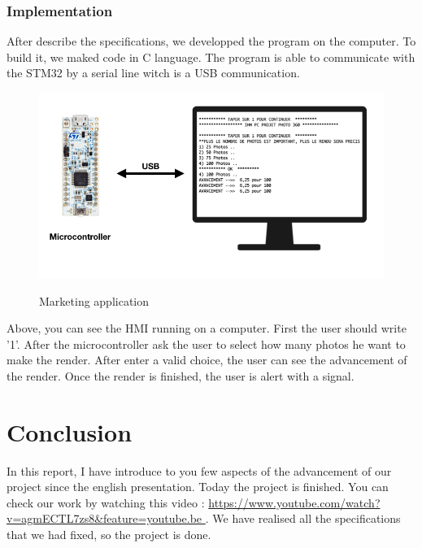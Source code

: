   \subsubsection {Implementation } 

After describe the specifications, we developped the program on the computer. To build it,  we maked code in C language. The program is able to communicate with the STM32 by a serial line witch is a USB communication. 
\newpage

\begin{figure}[h]
    \centering
    \includegraphics[scale=0.4]{img/IHM_PC.png}\\%
    \caption{Marketing application}
    \label{fig:LogoTachyssema}
  \end{figure}

  Above, you can see the HMI running on a computer. First the user should write '1'. After the microcontroller ask the user to select how many photos he want to make the render. After enter a valid choice, the user can see the advancement of the render. Once the render is finished, the user is alert with a signal. 

\section {Conclusion } 

In this report, I have introduce to you few aspects of the advancement of our project since the english presentation. Today the project is finished. You can check our work by watching this video : \url{https://www.youtube.com/watch?v=agmECTL7zs8&feature=youtube.be }. 
We have realised all the specifications that we had fixed, so the project is done. 